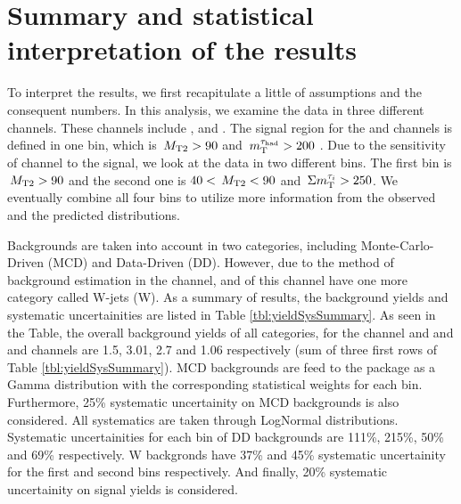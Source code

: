 
\section[Statistics]{Summary and statistical interpretation of the results}
\label{sect:stat}

To interpret the results, we first recapitulate a little of assumptions and the consequent numbers.
In this analysis, we examine the data in three different channels.
These channels include \tauTau, \muTau and \eTau.
The signal region for the \muTau and \eTau channels is defined in one bin, which is $\,{M_{\rm T2}} > 90$ and $\,m_{\rm T}^{\tau_{\rm had}} > 200$ .
Due to the sensitivity of \tauTau channel to the signal, we look at the data in two different bins.
The first bin is $\,{M_{\rm T2}} > 90$ and the second one is $40 < \,{M_{\rm T2}} < 90$ and $\,\Sigma m_{\rm T}^{\tau_i} > 250$.
We eventually combine all four bins to utilize more information from the observed and the predicted distributions.


Backgrounds are taken into account in two categories, including Monte-Carlo-Driven (MCD) and Data-Driven (DD).
However, due to the method of background estimation in the \tauTau channel, \binone and \bintwo of this channel have one more category called W-jets (W).
As a summary of results, the background yields and systematic uncertainities are listed in Table \ref{tbl:yieldSysSummary}.
As seen in the Table, the overall background yields of all categories, for the \tauTau channel \binone and \bintwo and \eTau and \muTau channels are  1.5, 3.01, 2.7 and 1.06 respectively (sum of three first rows of Table \ref{tbl:yieldSysSummary}).
MCD backgrounds are feed to the package as a Gamma distribution with the corresponding statistical weights for each bin.
Furthermore, 25\% systematic uncertainity on MCD backgrounds is also considered.
All systematics are taken through LogNormal distributions.
Systematic uncertainities for each bin of DD backgrounds are 111\%, 215\%, 50\% and 69\% respectively.  
W backgronds have 37\% and 45\% systematic uncertainity for the first and second bins respectively.
And finally, 20\% systematic uncertainity on signal yields is considered. 


